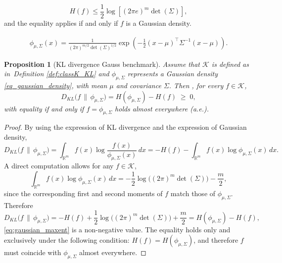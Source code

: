 \documentclass[10pt,a4paper]{amsart}
\newtheorem{proposition}{Proposition}
\begin{document}
\begin{equation}\label{eq:gaussian_maxent}
H(f) \leq \frac{1}{2}\log\left[(2\pi e)^m \det({\Sigma})\right],
\end{equation} and the equality applies if and only if $f$ is a Gaussian density.

\begin{align}
\phi_{{\mu},{\Sigma}}({x})
= \frac{1}{(2\pi)^{m/2}\det({\Sigma})^{1/2}}
\exp\!\left(-\frac{1}{2}({x}-{\mu})^{\top}{\Sigma}^{-1}({x}-{\mu})\right). \label{eq_gaussian_density}
\end{align}

\begin{proposition}[KL divergence Gauss benchmark]\label{prop:KL_maxent}
Assume that $\mathcal{K}$ is defined as in~{Definition} \ref{def:classK_KL} and
$\phi_{{\mu},{\Sigma}}$ represents a Gaussian density {\eqref{eq_gaussian_density}}, with mean ${\mu}$ and
covariance ${\Sigma}$. Then , for every $f \in \mathcal{K}$,
\begin{equation}\label{eq:KL_gaussian_representation}
D_{KL}\bigl(f \,\|\, \phi_{{\mu},{\Sigma}}\bigr)
= H(\phi_{{\mu},{\Sigma}}) - H(f)
\;\geq\; 0,
\end{equation}
with equality if and only if $f = \phi_{{\mu},{\Sigma}}$ holds almost everywhere (a.e.).
\end{proposition}

\begin{proof}
By using the expression of KL divergence and the expression of Gaussian density,
\[
D_{KL}\bigl(f \,\|\, \phi_{{\mu},{\Sigma}}\bigr)
= \int_{\mathbb{R}^m} f({x}) \log \frac{f({x})}{\phi_{{\mu},{\Sigma}}({x})}\,d{x}
= -H(f) - \int_{\mathbb{R}^m} f({x}) \log \phi_{{\mu},{\Sigma}}({x})\,d{x}.
\]
A direct computation allows for any $f \in \mathcal{K}$,
\[
\int_{\mathbb{R}^m} f({x}) \log \phi_{{\mu},{\Sigma}}({x})\,d{x}
= -\frac{1}{2}\log\bigl((2\pi)^m \det({\Sigma})\bigr) - \frac{m}{2},
\]
since the corresponding first and second moments of $f$ match those of $\phi_{{\mu},{\Sigma}}$.
Therefore
\[
D_{KL}\bigl(f \,\|\, \phi_{{\mu},{\Sigma}}\bigr)
= -H(f) + \frac{1}{2}\log\bigl((2\pi)^m \det({\Sigma})\bigr) + \frac{m}{2}
= H(\phi_{{\mu},{\Sigma}}) - H(f),
\]
\eqref{eq:gaussian_maxent} is a non-negative value. The equality holds only and exclusively under the following condition:
$H(f)=H(\phi_{{\mu},{\Sigma}})$, and therefore $f$ must coincide with
$\phi_{{\mu},{\Sigma}}$ { almost everywhere}.
\end{proof}
\end{document}

